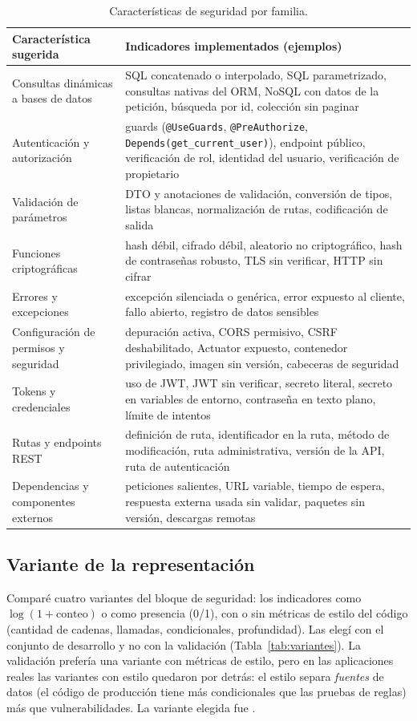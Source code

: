 \documentclass[12pt,a4paper]{article}
\newcommand{\cod}[1]{\texttt{#1}}
\begin{document}
\begin{table}[H]
\centering\footnotesize
\caption{Características de seguridad por familia.}
\label{tab:caracteristicas}
\begin{tabularx}{\textwidth}{@{}P{4.2cm}Y@{}}
\toprule
\textbf{Característica sugerida} & \textbf{Indicadores implementados (ejemplos)}\\
\midrule
Consultas dinámicas a bases de datos & SQL concatenado o interpolado, SQL parametrizado, consultas nativas del ORM, NoSQL con datos de la petición, búsqueda por id, colección sin paginar\\
Autenticación y autorización & guards (\cod{@UseGuards}, \cod{@PreAuthorize}, \cod{Depends(get\_current\_user)}), endpoint público, verificación de rol, identidad del usuario, verificación de propietario\\
Validación de parámetros & DTO y anotaciones de validación, conversión de tipos, listas blancas, normalización de rutas, codificación de salida\\
Funciones criptográficas & hash débil, cifrado débil, aleatorio no criptográfico, hash de contraseñas robusto, TLS sin verificar, HTTP sin cifrar\\
Errores y excepciones & excepción silenciada o genérica, error expuesto al cliente, fallo abierto, registro de datos sensibles\\
Configuración de permisos y seguridad & depuración activa, CORS permisivo, CSRF deshabilitado, Actuator expuesto, contenedor privilegiado, imagen sin versión, cabeceras de seguridad\\
Tokens y credenciales & uso de JWT, JWT sin verificar, secreto literal, secreto en variables de entorno, contraseña en texto plano, límite de intentos\\
Rutas y endpoints REST & definición de ruta, identificador en la ruta, método de modificación, ruta administrativa, versión de la API, ruta de autenticación\\
Dependencias y componentes externos & peticiones salientes, URL variable, tiempo de espera, respuesta externa usada sin validar, paquetes sin versión, descargas remotas\\
\bottomrule
\end{tabularx}
\end{table}

\subsection{Variante de la representación}
Comparé cuatro variantes del bloque de seguridad: los indicadores como \(\log(1 + \text{conteo})\) o como presencia (0/1), con o sin métricas de estilo del código (cantidad de cadenas, llamadas, condicionales, profundidad). Las elegí con el conjunto de desarrollo y no con la validación (Tabla~\ref{tab:variantes}). La validación prefería una variante con métricas de estilo, pero en las aplicaciones reales las variantes con estilo quedaron por detrás: el estilo separa \emph{fuentes} de datos (el código de producción tiene más condicionales que las pruebas de reglas) más que vulnerabilidades. La variante elegida fue \emph{\variante}.
\end{document}
